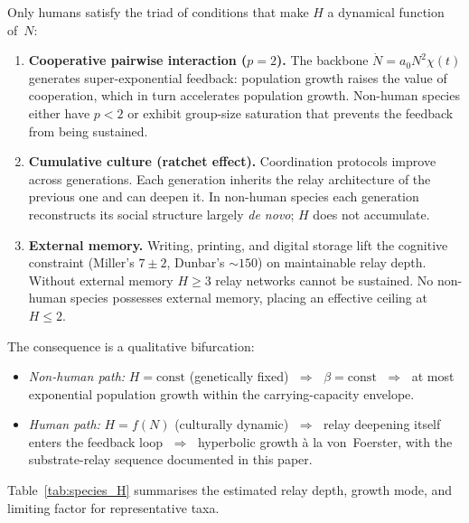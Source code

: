 \documentclass[11pt]{article}
\begin{document}
\medskip
\noindent
Only humans satisfy the triad of conditions that make $H$ a dynamical
function of~$N$:
\begin{enumerate}
\item \textbf{Cooperative pairwise interaction ($p = 2$).}
  The backbone $\dot N = a_0 N^2 \chi(t)$ generates super-exponential
  feedback: population growth raises the value of cooperation, which
  in turn accelerates population growth.  Non-human species either
  have $p < 2$ or exhibit group-size saturation that prevents the
  feedback from being sustained.

\item \textbf{Cumulative culture (ratchet effect).}
  Coordination protocols improve across generations.  Each generation
  inherits the relay architecture of the previous one and can deepen it.
  In non-human species each generation reconstructs its social structure
  largely \emph{de novo}; $H$ does not accumulate.

\item \textbf{External memory.}
  Writing, printing, and digital storage lift the cognitive constraint
  (Miller's $7 \pm 2$, Dunbar's ${\sim}150$) on maintainable relay
  depth.  Without external memory $H \ge 3$ relay networks cannot be
  sustained.  No non-human species possesses external memory, placing an
  effective ceiling at $H \le 2$.
\end{enumerate}

\medskip
\noindent
The consequence is a qualitative bifurcation:
\begin{itemize}
\item \emph{Non-human path:}  $H = \mathrm{const}$ (genetically fixed)
  $\;\Rightarrow\;$ $\beta = \mathrm{const}$
  $\;\Rightarrow\;$ at most exponential population growth within the
  carrying-capacity envelope.
\item \emph{Human path:}  $H = f(N)$ (culturally dynamic)
  $\;\Rightarrow\;$ relay deepening itself enters the feedback loop
  $\;\Rightarrow\;$ hyperbolic growth \`a la von~Foerster, with the
  substrate-relay sequence documented in this paper.
\end{itemize}

\noindent
Table~\ref{tab:species_H} summarises the estimated relay depth, growth
mode, and limiting factor for representative taxa.
\end{document}
